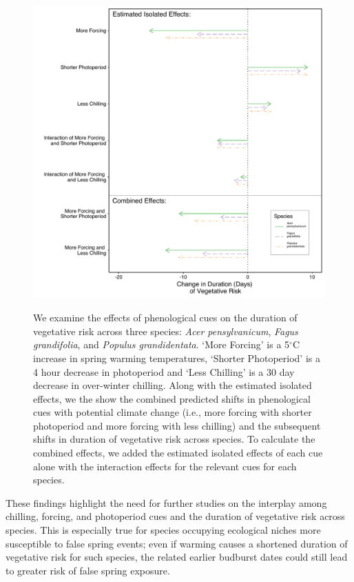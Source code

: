 \documentclass{article}\usepackage[]{graphicx}\usepackage[]{color}
\begin{document}
\begin{figure} [H] 
 \begin{center}
 \includegraphics[width=12cm, height=12cm]{..//figure/Exp_plotTPS.pdf} 
 \caption{We examine the effects of phenological cues on the duration of vegetative risk across three species: \textit{Acer pensylvanicum}, \textit{Fagus grandifolia}, and \textit{Populus grandidentata}. `More Forcing' is a 5$^{\circ}$C increase in spring warming temperatures, `Shorter Photoperiod' is a 4 hour decrease in photoperiod and `Less Chilling' is a 30 day decrease in over-winter chilling. Along with the estimated isolated effects, we the show the combined predicted shifts in phenological cues with potential climate change (i.e., more forcing with shorter photoperiod and more forcing with less chilling) and the subsequent shifts in duration of vegetative risk across species. To calculate the combined effects, we added the estimated isolated effects of each cue alone with the interaction effects for the relevant cues for each species. }\label{fig:dan} 
 \end{center}
 \end{figure}

These findings highlight the need for further studies on the interplay among chilling, forcing, and photoperiod cues and the duration of vegetative risk across species. This is especially true for species occupying ecological niches more susceptible to false spring events; even if warming causes a shortened duration of vegetative risk for such species, the related earlier budburst dates could still lead to greater risk of false spring exposure.
\end{document}
